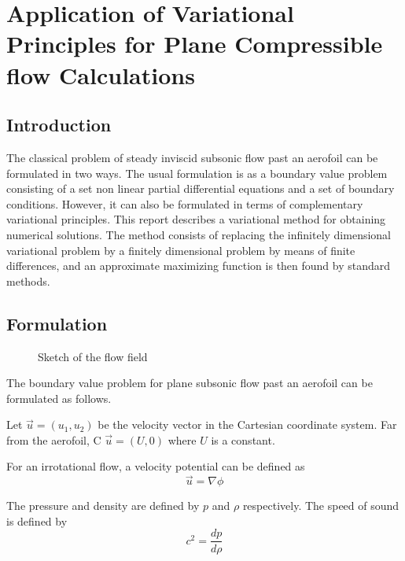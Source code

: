 \documentclass[a4paper]{report}
\begin{document}
	
	
			
	
	\chapter{Application of Variational Principles for Plane Compressible flow Calculations}
	
	\section{Introduction}
	The classical problem of steady inviscid subsonic flow past an aerofoil can be formulated in two ways. The usual formulation is as a boundary value problem consisting of a set non linear partial differential equations and a set of boundary conditions. However, it can also be formulated in terms of complementary variational principles. This report describes a variational method for obtaining numerical solutions. The method consists of replacing the infinitely dimensional variational problem by a finitely dimensional problem by means of finite differences, and an approximate maximizing function is then found by standard methods. 

	\section{Formulation}
	
	
	\begin{figure}
		\centering
  		\caption{Sketch of the flow field}
  	\end{figure}	
  	
	The boundary value problem for plane subsonic flow	 past an aerofoil can be formulated as follows.
	
	Let $\vec{u}=(u_1,u_2)$ be the velocity vector in the Cartesian coordinate system. Far from the aerofoil, C $\vec{u}=(U,0)$ where $U$ is a constant.
	
	For an irrotational flow, a velocity potential can be defined as 
	$$ \vec{u} = \nabla \phi$$
	
	The pressure and density are defined by $p$ and $\rho$ respectively. The speed of sound is defined by
	$$c^2=\frac{dp}{d\rho}$$
	
\end{document}
